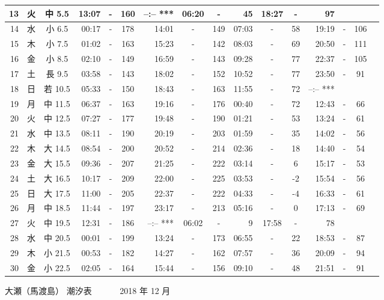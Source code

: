 \documentclass[12pt.a4j]{jsarticle}
\begin{document}
\begin{center}
\begin{table}[ht]
\begin{tabular}{|rc|cr|ccrccr|ccrccr|}
\hline
13 & 火 & 中  5.5 & 13:07 &-& 160 & --:--   *** & 06:20 &-&  45 & 18:27 &-&  97 \\
\hline
14 & 水 & 小  6.5 & 00:17 &-& 178 & 14:01 &-& 149 & 07:03 &-&  58 & 19:19 &-& 106 \\
\hline
15 & 木 & 小  7.5 & 01:02 &-& 163 & 15:23 &-& 142 & 08:03 &-&  69 & 20:50 &-& 111 \\
\hline
16 & 金 & 小  8.5 & 02:10 &-& 149 & 16:59 &-& 143 & 09:28 &-&  77 & 22:37 &-& 105 \\
\hline
17 & 土 & 長  9.5 & 03:58 &-& 143 & 18:02 &-& 152 & 10:52 &-&  77 & 23:50 &-&  91 \\
\hline
18 & 日 & 若 10.5 & 05:33 &-& 150 & 18:43 &-& 163 & 11:55 &-&  72 & --:--   *** \\
\hline
19 & 月 & 中 11.5 & 06:37 &-& 163 & 19:16 &-& 176 & 00:40 &-&  72 & 12:43 &-&  66 \\
\hline
20 & 火 & 中 12.5 & 07:27 &-& 177 & 19:48 &-& 190 & 01:21 &-&  53 & 13:24 &-&  61 \\
\hline
21 & 水 & 中 13.5 & 08:11 &-& 190 & 20:19 &-& 203 & 01:59 &-&  35 & 14:02 &-&  56 \\
\hline
22 & 木 & 大 14.5 & 08:54 &-& 200 & 20:52 &-& 214 & 02:36 &-&  18 & 14:40 &-&  54 \\
\hline
23 & 金 & 大 15.5 & 09:36 &-& 207 & 21:25 &-& 222 & 03:14 &-&   6 & 15:17 &-&  53 \\
\hline
24 & 土 & 大 16.5 & 10:17 &-& 209 & 22:00 &-& 225 & 03:53 &-&  -2 & 15:54 &-&  56 \\
\hline
25 & 日 & 大 17.5 & 11:00 &-& 205 & 22:37 &-& 222 & 04:33 &-&  -4 & 16:33 &-&  61 \\
\hline
26 & 月 & 中 18.5 & 11:44 &-& 197 & 23:17 &-& 213 & 05:16 &-&   0 & 17:13 &-&  69 \\
\hline
27 & 火 & 中 19.5 & 12:31 &-& 186 & --:--   *** & 06:02 &-&   9 & 17:58 &-&  78 \\
\hline
28 & 水 & 中 20.5 & 00:01 &-& 199 & 13:24 &-& 173 & 06:55 &-&  22 & 18:53 &-&  87 \\
\hline
29 & 木 & 小 21.5 & 00:53 &-& 182 & 14:27 &-& 162 & 07:57 &-&  36 & 20:09 &-&  94 \\
\hline
30 & 金 & 小 22.5 & 02:05 &-& 164 & 15:44 &-& 156 & 09:10 &-&  48 & 21:51 &-&  91 \\
\hline
\end{tabular}
\end{table}
\newpage
 {\LARGE 大瀬（馬渡島）  潮汐表　　　}
 {\large 2018 年 12 月}\\
 \begin{table}[ht]

\end{table}
\end{center}
\end{document}

